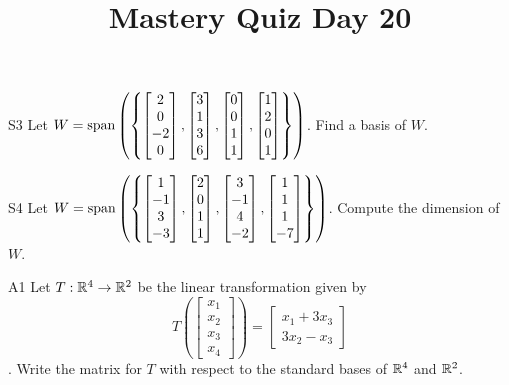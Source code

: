 \documentclass{sbgLAquiz}
\title{Mastery Quiz Day 20 }
\begin{document}
\begin{problem}{S3}
Let $W={\rm span}\left(\left\{\begin{bmatrix} 2 \\ 0 \\ -2 \\ 0 \end{bmatrix}, \begin{bmatrix} 3 \\ 1 \\ 3 \\ 6 \end{bmatrix}, \begin{bmatrix} 0 \\ 0 \\ 1 \\ 1 \end{bmatrix}, \begin{bmatrix}1 \\ 2 \\ 0 \\ 1 \end{bmatrix}\right\}\right)$.  Find a basis of $W$.
\end{problem}

\begin{problem}{S4}
Let $W={\rm span}\left( \left\{ \begin{bmatrix} 1 \\ -1 \\ 3 \\ -3 \end{bmatrix},\begin{bmatrix} 2 \\ 0 \\ 1 \\ 1 \end{bmatrix}, \begin{bmatrix} 3 \\ -1 \\ 4 \\ -2 \end{bmatrix},  \begin{bmatrix} 1 \\ 1 \\ 1 \\ -7 \end{bmatrix} \right\}\right)$.  Compute the dimension of $W$.
\end{problem}
\newpage

\begin{problem}{A1}
Let $T: \mathbb{R}^4 \rightarrow \mathbb{R}^2$ be the linear transformation given by $$T\left(\begin{bmatrix} x_1 \\ x_2 \\ x_3 \\ x_4 \end{bmatrix} \right) = \begin{bmatrix} x_1+3x_3 \\ 3x_2-x_3 \end{bmatrix}$$. Write the matrix for $T$ with respect to the standard bases of $\mathbb{R}^4$ and $\mathbb{R}^2$.
\end{problem}
\end{document}
